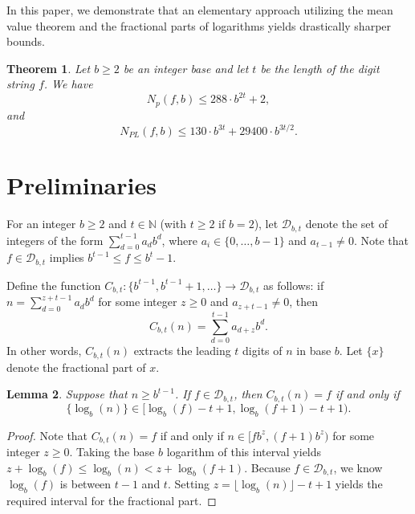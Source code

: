 \documentclass[12pt]{amsart}
\numberwithin{equation}{section}
\newtheorem{thm}{Theorem}[section]
\newtheorem{lem}[thm]{Lemma}
\newcommand{\N}{\mathbb{N}}
\begin{document}
In this paper, we demonstrate that an elementary approach utilizing the mean value theorem and the fractional parts of logarithms yields drastically sharper bounds.

\begin{thm}
\label{PartitionDigitthm}
Let $b \geq 2$ be an integer base and let $t$ be the length of the digit string $f$. We have
\begin{equation*}
N_{p}(f,b) \leq 288 \cdot b^{2t}+2,
\end{equation*}
and
\begin{equation*}
N_{PL}(f,b) \leq 130 \cdot b^{3t} + 29400 \cdot b^{3t/2}.
\end{equation*}
\end{thm}

\section{Preliminaries}

For an integer $b \geq 2$ and $t \in \N$ (with $t \geq 2$ if $b = 2$), let $\mathcal{D}_{b,t}$ denote the set of integers of the form $\sum_{d=0}^{t-1}a_{d} b^{d}$, where $a_{i} \in \{0,\ldots,b-1\}$ and $a_{t-1} \neq 0$. Note that $f \in \mathcal{D}_{b,t}$ implies $b^{t-1} \le f \le b^t - 1$. 

Define the function $C_{b,t}: \{b^{t-1}, b^{t-1}+1,\ldots\} \rightarrow \mathcal{D}_{b,t}$ as follows: if $n = \sum_{d=0}^{z+t-1}a_{d} b^{d}$ for some integer $z \geq 0$ and $a_{z+t-1} \neq 0$, then 
\begin{equation*}
C_{b,t}(n) = \sum_{d=0}^{t-1}a_{d+z} b^{d}.
\end{equation*}
In other words, $C_{b,t}(n)$ extracts the leading $t$ digits of $n$ in base $b$. Let $\{x\}$ denote the fractional part of $x$.

\begin{lem}
\label{logdigitmod1}
Suppose that $n \geq b^{t-1}$. If $f \in \mathcal{D}_{b,t}$, then $C_{b,t}(n) = f$ if and only if 
\begin{equation*}
\{\log_{b}(n)\} \in [\log_{b}(f)-t+1, \log_{b}(f+1)-t+1).
\end{equation*}
\end{lem}
\begin{proof}
Note that $C_{b,t}(n) = f$ if and only if $n \in [fb^{z},(f+1)b^z)$ for some integer $z \geq 0$. Taking the base $b$ logarithm of this interval yields $z + \log_b(f) \le \log_b(n) < z + \log_b(f+1)$. Because $f \in \mathcal{D}_{b,t}$, we know $\log_b(f)$ is between $t-1$ and $t$. Setting $z = \lfloor \log_b(n) \rfloor - t + 1$ yields the required interval for the fractional part.
\end{proof}
\end{document}
